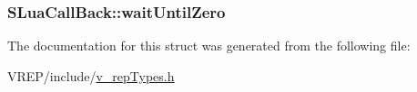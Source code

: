 \hypertarget{struct_s_lua_call_back_a2baf621a41fc0ad23c807d2091f3b6cc}{
\subsubsection[{wait\-Until\-Zero}]{ S\-Lua\-Call\-Back\-::wait\-Until\-Zero}}\label{struct_s_lua_call_back_a2baf621a41fc0ad23c807d2091f3b6cc}


The documentation for this struct was generated from the following file\-:\begin{DoxyCompactItemize}
\item 
V\-R\-E\-P/include/\hyperlink{v__rep_types_8h}{v\-\_\-rep\-Types.\-h}\end{DoxyCompactItemize}
